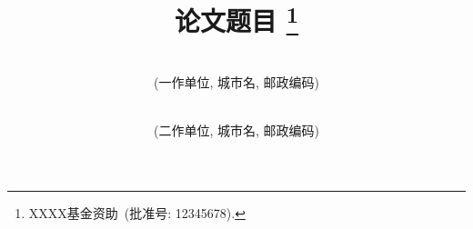 \documentclass[Chinese]{APSart}
\begin{document}
\newcommand{\runcnauthors}{作者列表}  
\newcommand{\cnfirstauthor}{一作姓名}
\newcommand{\cnsecondauthor}{二作姓名$^\star$}
\newcommand{\cnfirstinst}{一作单位, 城市名, 邮政编码}
\newcommand{\cnsecondinst}{二作单位, 城市名, 邮政编码}
\newcommand{\authorsinfo}{\textbf{作者信息}:~
第一作者(出生时间--),~性别,~职称,~主要研究方向:~xxxxxx,~E-mail:xxxxx@xxxx.xxx.xx~;
第二作者(出生时间--):~性别, 职称,主要研究方向:~xxxxxx,~E-mail:xxxxx@xxxx.xxx.xx~.}
\newcommand{\caemail}{abc@xyz.edu.cn}
\newcommand{\cntitle}{论文题目}
\newcommand{\hdcntitle}{页眉上论文题目}
\newcommand{\cnkeywords}{关键词1; 关键词2; 关键词3; 关键词4}
\newcommand{\cnclassno}{Oxxx.xx (网站: \url{http://www.ztflh.com/})}  %
\newcommand{\cnfundinfo}{XXXX基金资助~(批准号: 12345678).}
\newcommand{\cnabstract}{摘要内容摘要内容摘要内容摘要内容摘要内容摘要内容摘要内容摘要内容摘要内容摘要内容摘要内容
	摘要内容摘要内容摘要内容摘要内容摘要内容摘要内容摘要内容摘要内容摘要内容摘要内容摘要内容摘要内容摘要内容.}
\newcommand{\enfirstauthor}{First Name}
\newcommand{\ensecondauthor}{Second Name}
\newcommand{\enfirstinst}{First Author's Working Unit, City, Zip Code, Country}
\newcommand{\ensecondinst}{Second Author's Working Unit, City, Zip Code, Country}
\newcommand{\entitle}{Article Title}
\newcommand{\hdentitle}{Article Title on page header}
\newcommand{\enkeywords}{Keyword 1； Keyword 2; Keyword 3; Keyword 4}
\newcommand{\amsno}{62xxx (网站:\url{https://mathscinet.ams.org/msc/})} %
\newcommand{\enfundinfo}{The project was supported by grant name(s) (Grant No(s) 1234, 5678).}
\newcommand{\enabstract}{The abstract comes here! The abstract comes here! The abstract comes here! The abstract comes here!
The abstract comes here! The abstract comes here! The abstract comes here! The abstract comes here! The abstract comes here!} %
%
\title{\bf{\cntitle}
	\!\thanks{\cnfundinfo}}
\author{\kaishu{\cnfirstauthor}\\[-1pt]
	{(\cnfirstinst)}\and
	\kaishu{\cnsecondauthor}\\[-1pt]
	{(\cnsecondinst)}}
\date{} %
\maketitle
\vspace{-6mm}
\end{document}
